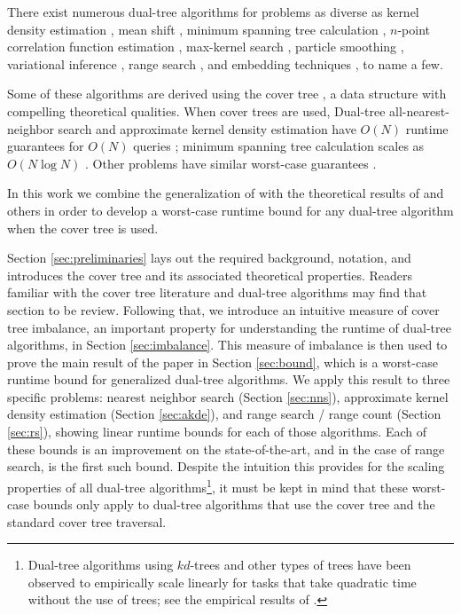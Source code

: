 \documentclass[twoside,11pt]{article} %
\begin{document}
There exist numerous dual-tree algorithms for problems as diverse as kernel
density estimation \citep{gray2003nonparametric}, mean shift \citep{wang2007fast},
minimum spanning tree calculation \citep{march2010euclidean}, $n$-point
correlation function estimation \citep{march2012fast}, max-kernel search
\citep{curtin2013fast}, particle smoothing \citep{klaas2006fast}, variational
inference \citep{amizadeh2012variational}, range search \citep{nbody}, and
embedding techniques \cite{maaten2014accelerating}, to name a few.

Some of these algorithms are derived using the cover tree \citep{langford2006}, a
data structure with compelling theoretical qualities.  When cover trees are
used, Dual-tree all-nearest-neighbor search and approximate kernel density
estimation have $O(N)$ runtime guarantees for $O(N)$ queries \citep{ram2009};
minimum spanning tree calculation scales as $O(N \log N)$
\citep{march2010euclidean}.  Other problems have similar worst-case guarantees
\citep{curtin2014dual, march2013multi}.

In this work we combine the generalization of \citet{curtin2013tree} with the
theoretical results of \citet{langford2006} and others in order to develop a
worst-case runtime bound for any dual-tree algorithm when the cover tree is
used.

Section \ref{sec:preliminaries} lays out the required background, notation, and
introduces the cover tree and its associated theoretical properties.  Readers
familiar with the cover tree literature and dual-tree algorithms
\citep[especially][]{curtin2013tree} may find that section to be review.
Following that, we introduce an intuitive measure of cover tree imbalance, an
important property for understanding the runtime of dual-tree algorithms, in
Section \ref{sec:imbalance}.  This measure of imbalance is then used to prove
the main result of the paper in Section \ref{sec:bound}, which is a worst-case
runtime bound for generalized dual-tree algorithms.  We apply this result to
three specific problems: nearest neighbor search (Section \ref{sec:nns}),
approximate kernel density estimation (Section \ref{sec:akde}), and range search
/ range count (Section \ref{sec:rs}), showing linear runtime bounds for each of
those algorithms.  Each of these bounds is an improvement on the
state-of-the-art, and in the case of range search, is the first such bound.
Despite the intuition this provides for the scaling properties of all dual-tree
algorithms\footnote{Dual-tree algorithms using $kd$-trees and other types of
trees have been observed to empirically scale linearly for tasks that take
quadratic time without the use of trees; see the empirical results of
\citet{nbody, march2010euclidean, vladymyrov2014linear, klaas2006fast,
gray2003nonparametric}.}, it must be kept in mind that these worst-case bounds
only apply to dual-tree algorithms that use the cover tree and the standard
cover tree traversal.
\end{document}
